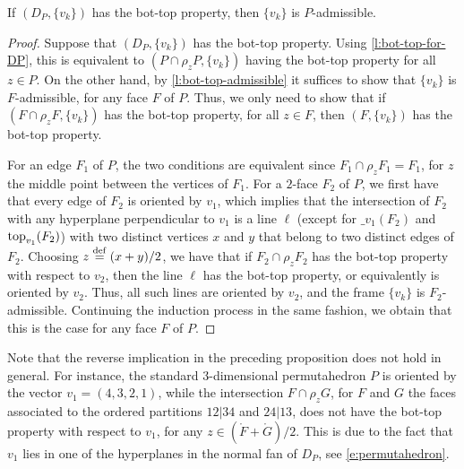 \begin{theorem}
	If $(D_P,\{v_k\})$ has the bot-top property, then $\{v_k\}$ is $P$-admissible.
\end{theorem}

\begin{proof}
	Suppose that $(D_P,\{v_k\})$ has the bot-top property.
	Using \cref{l:bot-top-for-DP}, this is equivalent to $(P\cap\rho_z P, \{v_k\})$ having the bot-top property for all $z \in P$.
	On the other hand, by \cref{l:bot-top-admissible} it suffices to show that $\{v_k\}$ is $F$-admissible, for any face $F$ of $P$.
	Thus, we only need to show that if $(F \cap \rho_z F, \{v_k\})$ has the bot-top property, for all $z \in F$, then $(F,\{v_k\})$ has the bot-top property.

	For an edge $F_1$ of $P$, the two conditions are equivalent since $F_1 \cap \rho_z F_1 = F_1$, for $z$ the middle point between the vertices of $F_1$.
	For a $2$-face $F_2$ of $P$, we first have that every edge of $F_2$ is oriented by $v_1$, which implies that the intersection of $F_2$ with any hyperplane perpendicular to $v_1$ is a line $\ell$ (except for $\bm_{v_1}(F_2)$ and $\operatorname{top}_{v_1}(F_2)$) with two distinct vertices $x$ and $y$ that belong to two distinct edges of $F_2$.
	Choosing $z \stackrel{\mathrm{def}}{=} (x+y)/2$, we have that if $F_2 \cap \rho_z F_2$ has the bot-top property with respect to $v_2$, then the line $\ell$ has the bot-top property, or equivalently is oriented by $v_2$.
	Thus, all such lines are oriented by $v_2$, and the frame $\{v_k\}$ is $F_2$-admissible.
	Continuing the induction process in the same fashion, we obtain that this is the case for any face $F$ of $P$.
\end{proof}

\begin{example}
	Note that the reverse implication in the preceding proposition does not hold in general.
	For instance, the standard $3$-dimensional permutahedron $P$ is oriented by the vector $v_1=(4,3,2,1)$, while the intersection $F \cap \rho_z G$, for $F$ and $G$ the faces associated to the ordered partitions $12|34$ and $24|13$, does not have the bot-top property with respect to $v_1$, for any $z \in (\mathring F + \mathring G)/2$.
	This is due to the fact that $v_1$ lies in one of the hyperplanes in the normal fan of $D_P$, see \cref{e:permutahedron}.
\end{example}




